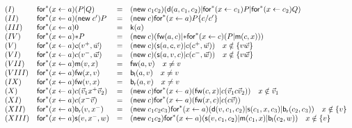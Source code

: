 \documentclass[submission,copyright,creativecommons]{eptcs}
\newcommand{\pzero}{\mathbin{0}}
\newcommand{\substn}[2]{\{ #1 / #2 \}}
\theoremstyle{definition}
\theoremstyle{remark}
\theoremstyle{remark}
\begin{document}
\[\begin{array}{llrl}
(I)&\mathsf{for}^*(x \leftarrow a)(P|Q) &=& (\mathsf{new}\; c_1c_2)(\mathsf{d}(a,c_1,c_2) | \mathsf{for}^*(x \leftarrow c_1)P | \mathsf{for}^*(x \leftarrow c_2)Q)\\
(II)&\mathsf{for}^*(x \leftarrow a)(\mathsf{new}\; c')P &=& (\mathsf{new}\; c)\mathsf{for}^*(x \leftarrow a)P\substn{c}{c'} \\
(III)& \mathsf{for}^*(x \leftarrow a)\pzero &=& \mathsf{k}(a) \\
(IV)&\mathsf{for}^*(x \leftarrow a)\mathsf{*}P &=& (\mathsf{new}\;c)(\mathsf{fw}(a,c) | \mathsf{*}\mathsf{for}^*(x \leftarrow c)(P | \mathsf{m}(c,x)))\\
(V)&\mathsf{for}^*(x \leftarrow a)c(v^+,\vec{w}) &=& (\mathsf{new}\;c)(\mathsf{s}(a,c,v) | c(c^+,\vec{w})) \mbox{\quad $x \notin \{v\vec{w}\}$}\\
(VI)&\mathsf{for}^*(x \leftarrow a)c(v^-,\vec{w})&=& (\mathsf{new}\;c)(\mathsf{s}(a,v,c) | c(c^-,\vec{w})) \mbox{\quad $x \notin \{v\vec{w}\}$}\\
(VII)&\mathsf{for}^*(x \leftarrow a)\mathsf{m}(v,x)&=& \mathsf{fw}(a,v) \mbox{\quad $x \neq v$}\\
(VIII)&\mathsf{for}^*(x \leftarrow a)\mathsf{fw}(x,v)&=& \mathsf{b}_{\mathsf{l}}(a,v) \mbox{\quad $x \neq v$}\\
(IX)&\mathsf{for}^*(x \leftarrow a)\mathsf{fw}(v,x)&=& \mathsf{b}_{\mathsf{r}}(a,v) \mbox{\quad $x \neq v$}\\
(X)&\mathsf{for}^*(x \leftarrow a)c(\vec{v}_1x^+\vec{v}_2)&=&(\mathsf{new}\; c)\mathsf{for}^*(x \leftarrow a)(\mathsf{fw}(c,x) | c(\vec{v}_1c\vec{v}_2)) \mbox{\quad $x \notin \vec{v}_1$}\\
(XI)&\mathsf{for}^*(x \leftarrow a)c(x^-\vec{v})&=& (\mathsf{new}\; c)\mathsf{for}^*(x \leftarrow a)(\mathsf{fw}(x,c) | c(c\vec{v}))\\
(XII)&\mathsf{for}^*(x \leftarrow a)\mathsf{b}_{\mathsf{r}}(v,x^-)&=& (\mathsf{new}\; c_1c_2c_3)\mathsf{for}^*(x \leftarrow a)(\mathsf{d}(v,c_1,c_2)|\mathsf{s}(c_1,x,c_3)|\mathsf{b}_{\mathsf{r}}(c_2,c_3)) \mbox{\quad $x \notin \{v \}$}\\
(XIII)&\mathsf{for}^*(x \leftarrow a)\mathsf{s}(v,x^-,w) &=& (\mathsf{new}\; c_1c_2)\mathsf{for}^*(x \leftarrow a)(\mathsf{s}(v,c_1,c_2) | \mathsf{m}(c_1,x) | \mathsf{b}_{\mathsf{l}}(c_2,w)) \mbox{\quad $x \notin \{v \}$}
\end{array}\]
\end{document}
